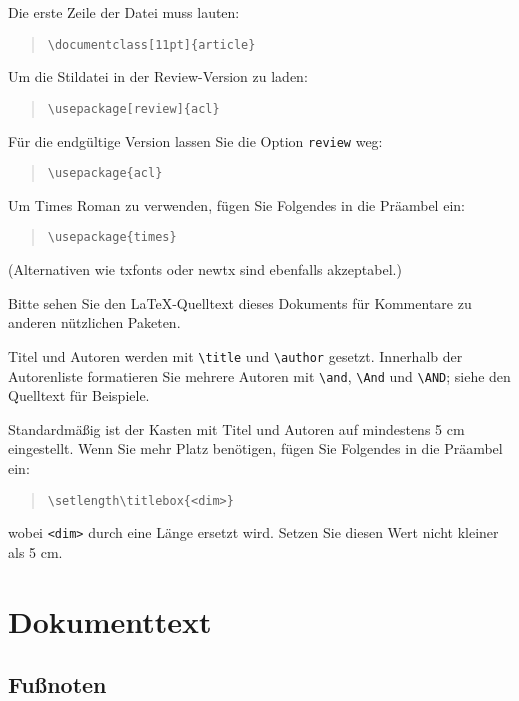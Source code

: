 \documentclass[11pt]{article}
\begin{document}
Die erste Zeile der Datei muss lauten:
\begin{quote}
\begin{verbatim}
\documentclass[11pt]{article}
\end{verbatim}
\end{quote}

Um die Stildatei in der Review-Version zu laden:
\begin{quote}
\begin{verbatim}
\usepackage[review]{acl}
\end{verbatim}
\end{quote}
Für die endgültige Version lassen Sie die Option \verb|review| weg:
\begin{quote}
\begin{verbatim}
\usepackage{acl}
\end{verbatim}
\end{quote}

Um Times Roman zu verwenden, fügen Sie Folgendes in die Präambel ein:
\begin{quote}
\begin{verbatim}
\usepackage{times}
\end{verbatim}
\end{quote}
(Alternativen wie txfonts oder newtx sind ebenfalls akzeptabel.)

Bitte sehen Sie den \LaTeX{}-Quelltext dieses Dokuments für Kommentare zu anderen nützlichen Paketen.

Titel und Autoren werden mit \verb|\title| und \verb|\author| gesetzt. Innerhalb der Autorenliste formatieren Sie mehrere Autoren mit \verb|\and|, \verb|\And| und \verb|\AND|; siehe den Quelltext für Beispiele.

Standardmäßig ist der Kasten mit Titel und Autoren auf mindestens 5 cm eingestellt. Wenn Sie mehr Platz benötigen, fügen Sie Folgendes in die Präambel ein:
\begin{quote}
\begin{verbatim}
\setlength\titlebox{<dim>}
\end{verbatim}
\end{quote}
wobei \verb|<dim>| durch eine Länge ersetzt wird. Setzen Sie diesen Wert nicht kleiner als 5 cm.

\section{Dokumenttext}

\subsection{Fußnoten}
\end{document}
